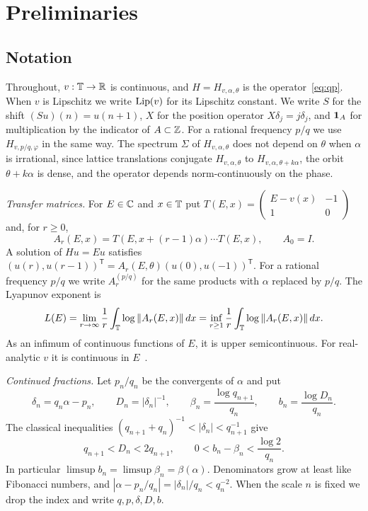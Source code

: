 \section{Preliminaries}\label{sec:prelim}

\subsection{Notation}

Throughout, $v:\mathbb T\to\mathbb R$ is continuous, and $H=H_{v,\alpha,\theta}$ is the operator~\eqref{eq:qp}. When $v$ is Lipschitz we write $\operatorname{Lip}(v)$ for its Lipschitz constant. We write $S$ for the shift $(Su)(n)=u(n+1)$, $X$ for the position operator $X\delta_j=j\delta_j$, and $\mathbf 1_A$ for multiplication by the indicator of $A\subset\mathbb Z$. For a rational frequency $p/q$ we use $H_{v,p/q,\varphi}$ in the same way. The spectrum $\Sigma$ of $H_{v,\alpha,\theta}$ does not depend on $\theta$ when $\alpha$ is irrational, since lattice translations conjugate $H_{v,\alpha,\theta}$ to $H_{v,\alpha,\theta+k\alpha}$, the orbit $\theta+k\alpha$ is dense, and the operator depends norm-continuously on the phase.

\emph{Transfer matrices.} For $E\in\mathbb C$ and $x\in\mathbb T$ put $T(E,x)=\begin{pmatrix}E-v(x)&-1\\1&0\end{pmatrix}$ and, for $r\ge0$,
\[
A_r(E,x)=T(E,x+(r-1)\alpha)\cdots T(E,x),\qquad A_0=I.
\]
A solution of $Hu=Eu$ satisfies $(u(r),u(r-1))^{\mathsf T}=A_r(E,\theta)(u(0),u(-1))^{\mathsf T}$. For a rational frequency $p/q$ we write $A^{(p/q)}_r$ for the same products with $\alpha$ replaced by $p/q$. The Lyapunov exponent is
\[
L(E)=\lim_{r\to\infty}\frac1r\int_\mathbb T\log\|A_r(E,x)\|\,dx=\inf_{r\ge1}\frac1r\int_\mathbb T\log\|A_r(E,x)\|\,dx .
\]
As an infimum of continuous functions of $E$, it is upper semicontinuous. For real-analytic $v$ it is continuous in $E$~\cite[Theorem~1]{BourgainJitomirskaya2002}.

\emph{Continued fractions.} Let $p_n/q_n$ be the convergents of $\alpha$ and put
\[
\delta_n=q_n\alpha-p_n,\qquad D_n=|\delta_n|^{-1},\qquad \beta_n=\frac{\log q_{n+1}}{q_n},\qquad b_n=\frac{\log D_n}{q_n}.
\]
The classical inequalities $(q_{n+1}+q_n)^{-1}<|\delta_n|<q_{n+1}^{-1}$ give
\begin{equation}\label{eq:bn}
q_{n+1}<D_n<2q_{n+1},\qquad 0<b_n-\beta_n<\frac{\log2}{q_n}.
\end{equation}
In particular $\limsup b_n=\limsup\beta_n=\beta(\alpha)$. Denominators grow at least like Fibonacci numbers, and $|\alpha-p_n/q_n|=|\delta_n|/q_n<q_n^{-2}$. When the scale $n$ is fixed we drop the index and write $q,p,\delta,D,b$.

